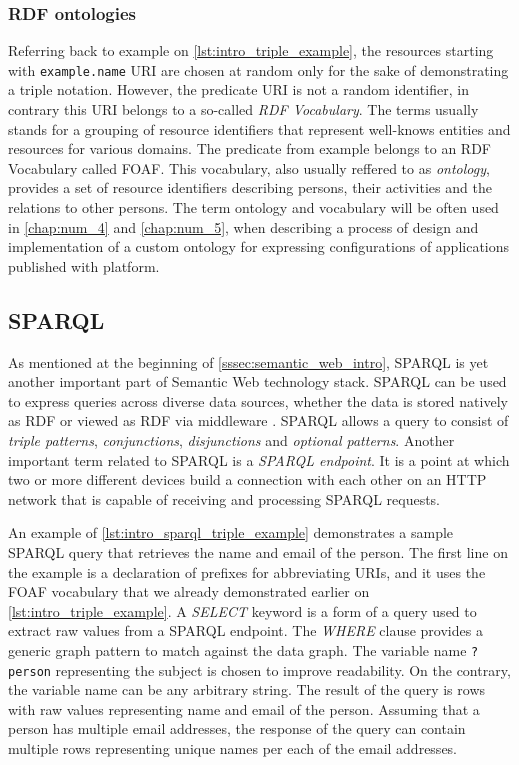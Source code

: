 \subsubsection{RDF ontologies}

Referring back to example on \autoref{lst:intro_triple_example}, the resources starting with \texttt{example.name} URI are chosen at random only for the sake of demonstrating a triple notation. However, the predicate URI is not a random identifier, in contrary this URI belongs to a so-called \textit{RDF Vocabulary}. The terms usually stands for a grouping of resource identifiers that represent well-knows entities and resources for various domains. The predicate from example belongs to an RDF Vocabulary called \gls{FOAF}. This vocabulary, also usually reffered to as \textit{ontology}, provides a set of resource identifiers describing persons, their activities and the relations to other persons. The term ontology and vocabulary will be often used in \autoref{chap:num_4} and \autoref{chap:num_5}, when describing a process of design and implementation of a custom ontology for expressing configurations of applications published with \lpa{} platform.

\subsection{SPARQL}

As mentioned at the beginning of \autoref{sssec:semantic_web_intro}, SPARQL is yet another important part of Semantic Web technology stack. SPARQL can be used to express queries across diverse data sources, whether the data is stored natively as RDF or viewed as RDF via middleware \cite{sparql_main_spec}\cite{sparql_specs}. SPARQL allows a query to consist of \textit{triple patterns}, \textit{conjunctions}, \textit{disjunctions} and \textit{optional patterns}. Another important term related to SPARQL is a \textit{SPARQL endpoint}. It is a point at which two or more different devices build a connection with each other on an HTTP network that is capable of receiving and processing SPARQL requests.

An example of \autoref{lst:intro_sparql_triple_example} demonstrates a sample SPARQL query that retrieves the name and email of the person. The first line on the example is a declaration of prefixes for abbreviating URIs, and it uses the FOAF vocabulary that we already demonstrated earlier on \autoref{lst:intro_triple_example}. A \textit{SELECT} keyword is a form of a query used to extract raw values from a SPARQL endpoint. The \textit{WHERE} clause provides a generic graph pattern to match against the data graph. The variable name \texttt{?person} representing the subject is chosen to improve readability. On the contrary, the variable name can be any arbitrary string. The result of the query is rows with raw values representing name and email of the person. Assuming that a person has multiple email addresses, the response of the query can contain multiple rows representing unique names per each of the email addresses. 


